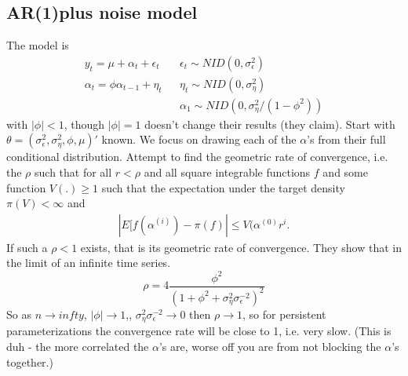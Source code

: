 \documentclass{article}\usepackage[]{graphicx}\usepackage[]{color}
\begin{document}
\subsection{AR(1)plus noise model}
The model is
\begin{align*}
  y_t = \mu + \alpha_t + \epsilon_t && \epsilon_t \sim NID(0,\sigma_\epsilon^2)\\
  \alpha_t = \phi \alpha_{t-1} + \eta_t && \eta_t \sim NID(0, \sigma_\eta^2)\\
  &&\alpha_1 \sim NID(0, \sigma_\eta^2/(1-\phi^2))
\end{align*}
with $|\phi|<1$, though $|\phi|=1$ doesn't change their results (they claim). Start with $\theta=(\sigma_\epsilon^2, \sigma_\eta^2, \phi,\mu)'$ known. We focus on drawing each of the $\alpha$'s from their full conditional distribution. Attempt to find the geometric rate of convergence, i.e. the $\rho$ such that for all $r<\rho$ and all square integrable functions $f$ and some function $V(.)\geq 1$ such that the expectation under the target density $\pi(V)<\infty$ and
\begin{align*}
  |E[f(\alpha^{(i)}) - \pi(f)|\leq V(\alpha^{(0)}r^i.
\end{align*}
If such a $\rho<1$ exists, that is its geometric rate of convergence. They show that in the limit of an infinite time series. 
\[
\rho = 4\frac{\phi^2}{(1 + \phi^2 + \sigma_\eta^2\sigma_\epsilon^{-2})^2}
\]
So as $n\to infty$, $|\phi|\to 1$,, $\sigma_\eta^2\sigma_\epsilon^{-2}\to 0$ then $\rho\to 1$, so for persistent parameterizations the convergence rate will be close to 1, i.e. very slow. (This is duh - the more correlated the $\alpha$'s are, worse off you are from not blocking the $\alpha$'s together.)
\end{document}

